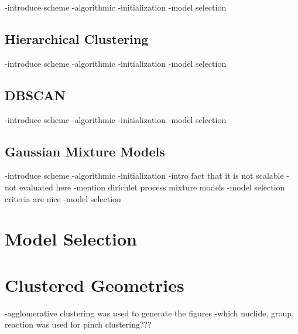 -introduce scheme
-algorithmic
-initialization
-model selection

\subsection{Hierarchical Clustering}
\label{subsec:chap10-agglomerative}

-introduce scheme
-algorithmic
-initialization
-model selection

\subsection{DBSCAN}
\label{subsec:chap10-dbscan}

-introduce scheme
-algorithmic
-initialization
-model selection

\subsection{Gaussian Mixture Models}
\label{subsec:chap10-gmms}

-introduce scheme
-algorithmic
-initialization
-intro fact that it is not scalable - not evaluated here
-mention dirichlet process mixture models
-model selection criteria are nice
-model selection

\section{Model Selection}
\label{sec:chap10-model-select}


\section{Clustered Geometries}
\label{sec:chap10-geometries}

-agglomerative clustering was used to generate the figures
-which nuclide, group, reaction was used for pinch clustering???


